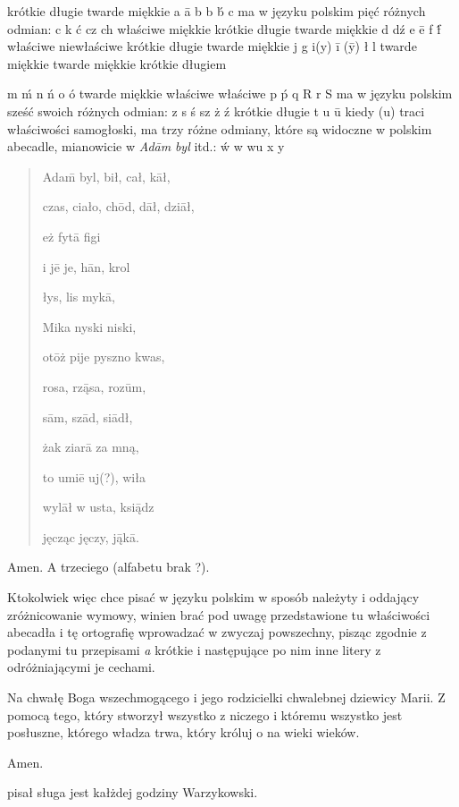 \documentclass[dvipsnames,12pt]{article}
\begin{document}
{
\obeylines
krótkie długie twarde miękkie
a ā b b b́
c ma w języku polskim pięć różnych odmian:
c k ć cz ch
właściwe miękkie krótkie długie twarde miękkie
d dź e ē f f́ 
właściwe niewłaściwe krótkie długie twarde miękkie
j g i(y) ī (ȳ) ł l
twarde miękkie twarde miękkie krótkie długiem

m ḿ n ń o ó
twarde miękkie właściwe właściwe
p ṕ q R r
S ma w języku polskim sześć swoich różnych odmian: 
z s ś sz ż ź 
krótkie długie
t u ū
kiedy (u) traci właściwości samogłoski, ma trzy
różne odmiany, które są widoczne w polskim abecadle, mianowicie w \textit{Adām}
\textit{byl} itd.:
ẃ w wu x y

}







\begin{quote}
  Adam̄ byl, bił, cał, kāł,

  czas, ciało, chōd, dāł, dziāł,

  eż fytā figi

  i jē je, hān, krol

  łys, lis mykā,

  Mika nyski niski,

  otōż  pije pyszno kwas,

  rosa, rzą̄sa, rozūm,

  sām, szād, siādł,

  żak ziarā za mną,

  to umiē uj(?), wiła

  wylāł w usta, ksią̄dz

  jęcząc jęczy, ją̄kā.
\end{quote}

Amen. A
trzeciego (alfabetu brak ?).

Ktokolwiek więc chce pisać w języku
polskim w sposób należyty i oddający zróżnicowanie wymowy, winien brać
pod uwagę przedstawione tu właściwości abecadła i tę ortografię
wprowadzać w zwyczaj powszechny, pisząc zgodnie z podanymi tu
przepisami \textit{a} krótkie i następujące po nim inne litery z odróżniającymi
je cechami.

Na chwałę Boga wszechmogącego i jego rodzicielki chwalebnej
dziewicy Marii. Z pomocą tego, który stworzył wszystko z niczego i
któremu wszystko jest posłuszne, którego władza trwa, który króluj o
na wieki wieków. 

Amen.

pisał sługa jest kałżdej godziny Warzykowski.
\end{document}
